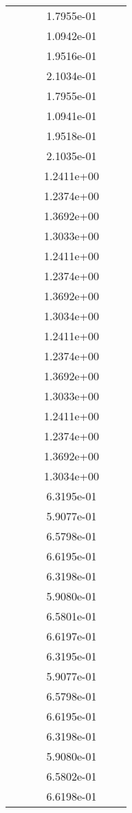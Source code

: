\begin{xltabular}{\textwidth}{r|rS[table-format=1.3e+2]S[table-format=1.4e+2]S[table-format=1.4e+2]S[table-format=-1.5]}
&  &  & 1.7955e-01 & & \\
&  &  & 1.0942e-01 & & \\
&  &  & 1.9516e-01 & & \\
&  &  & 2.1034e-01 & & \\
&  &  & 1.7955e-01 & & \\
&  &  & 1.0941e-01 & & \\
&  &  & 1.9518e-01 & & \\
&  &  & 2.1035e-01 & & \\
&  &  & 1.2411e+00 & & \\
&  &  & 1.2374e+00 & & \\
&  &  & 1.3692e+00 & & \\
&  &  & 1.3033e+00 & & \\
&  &  & 1.2411e+00 & & \\
&  &  & 1.2374e+00 & & \\
&  &  & 1.3692e+00 & & \\
&  &  & 1.3034e+00 & & \\
&  &  & 1.2411e+00 & & \\
&  &  & 1.2374e+00 & & \\
&  &  & 1.3692e+00 & & \\
&  &  & 1.3033e+00 & & \\
&  &  & 1.2411e+00 & & \\
&  &  & 1.2374e+00 & & \\
&  &  & 1.3692e+00 & & \\
&  &  & 1.3034e+00 & & \\
&  &  & 6.3195e-01 & & \\
&  &  & 5.9077e-01 & & \\
&  &  & 6.5798e-01 & & \\
&  &  & 6.6195e-01 & & \\
&  &  & 6.3198e-01 & & \\
&  &  & 5.9080e-01 & & \\
&  &  & 6.5801e-01 & & \\
&  &  & 6.6197e-01 & & \\
&  &  & 6.3195e-01 & & \\
&  &  & 5.9077e-01 & & \\
&  &  & 6.5798e-01 & & \\
&  &  & 6.6195e-01 & & \\
&  &  & 6.3198e-01 & & \\
&  &  & 5.9080e-01 & & \\
&  &  & 6.5802e-01 & & \\
&  &  & 6.6198e-01 & & \\

\end{xltabular}
